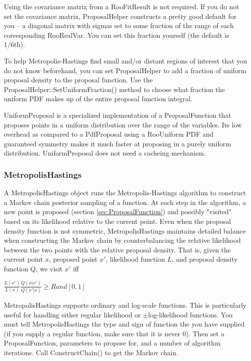 \documentclass[11pt]{article}
\begin{document}
	
	
	Using the covariance matrix from a RooFitResult is not required.  If you do not set the covariance matrix, ProposalHelper constructs a pretty good default for you -- a diagonal matrix with sigmas set to some fraction of the range of each corresponding RooRealVar.  You can set this fraction yourself (the default is 1/6th).
	
	To help Metropolis-Hastings find small and/or distant regions of interest that you do not know beforehand, you can set ProposalHelper to add a fraction of uniform proposal density to the proposal function.  Use the ProposalHelper::SetUniformFraction() method to choose what fraction the uniform PDF makes up of the entire proposal function integral.

	UniformProposal is a specialized implementation of a ProposalFunction that proposes points in a uniform distribution over the range of the variables.  Its low overhead as compared to a PdfProposal using a RooUniform PDF and guaranteed symmetry makes it much faster at proposing in a purely uniform distribution.  UniformProposal does not need a cacheing mechanism.
	
	\subsubsection{MetropolisHastings}
	\label{sec:MetropolisHastings}
	A MetropolisHastings object runs the Metropolis-Hastings algorithm to construct a Markov chain posterior sampling of a function.  At each step in the algorithm, a new point is proposed (section \ref{sec:ProposalFunction}) and possibly "visited" based on its likelihood relative to the current point.  Even when the proposal density function is not symmetric, MetropolisHastings maintains detailed balance when constructing the Markov chain by counterbalancing the relative likelihood between the two points with the relative proposal density.  That is, given the current point $x$, proposed point $x'$, likelihood function $L$, and proposal density function $Q$, we visit $x'$ iff
	\begin{center}
	$\displaystyle \frac{L(x')}{L(x)} \frac{Q(x | x')}{Q(x' | x)} \geq Rand[0,1]$
	\end{center}
	MetropolisHastings supports ordinary and log-scale functions.  This is particularly useful for handling either regular likelihood or $\pm$log-likelihood functions.  You must tell MetropolisHastings the type and sign of function the you have supplied (if you supply a regular function, make sure that it is never 0).  Then set a ProposalFunction, parameters to propose for, and a number of algorithm iterations.  Call ConstructChain() to get the Markov chain.
	
\end{document}
